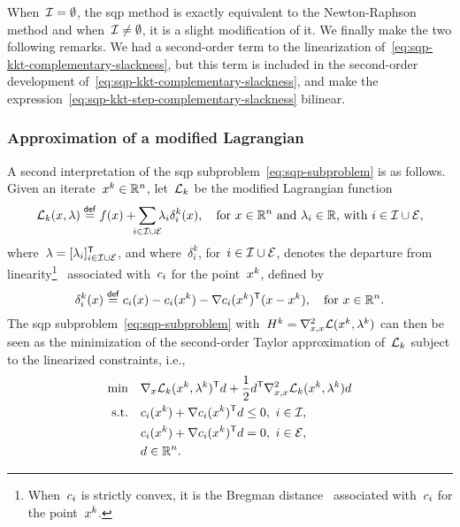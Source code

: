 When~$\mathcal{I} = \emptyset$, the \gls{sqp} method is exactly equivalent to the Newton-Raphson method and when~$\mathcal{I} \neq \emptyset$, it is a slight modification of it.
We finally make the two following remarks.
We had a second-order term to the linearization of~\cref{eq:sqp-kkt-complementary-slackness}, but this term is included in the second-order development of~\cref{eq:sqp-kkt-complementary-slackness}, and make the expression~\cref{eq:sqp-kkt-step-complementary-slackness} bilinear.

\subsubsection{Approximation of a modified Lagrangian}

A second interpretation of the \gls{sqp} subproblem~\cref{eq:sqp-subproblem} is as follows.
Given an iterate~$\iter[k] \in \R^n$, let~$\lag[k]$ be the modified Lagrangian function
\begin{equation*}
    \lag[k](\iter, \lm) \eqdef \obj(\iter) + \sum_{\mathclap{i \in \iub \cup \ieq}} \lm_i \delta_i^k(\iter), \quad \text{for~$\iter \in \R^n$ and~$\lm_i \in \R$, with~$i \in \iub \cup \ieq$},
\end{equation*}
where~$\lm = [\lm_i]_{i \in \iub \cup \ieq}^{\T}$, and where~$\delta_i^k$, for~$i \in \mathcal{I} \cup \mathcal{E}$, denotes the departure from linearity\footnote{When~$c_{i}$ is strictly convex, it is the Bregman distance~\cite{Bregman_1967} associated with~$c_{i}$ for the point~$\iter[k]$.}~\cite{Robinson_1972,Hoek_1982} associated with~$c_{i}$ for the point~$\iter[k]$, defined by
\begin{equation*}
    \delta_i^k(\iter) \eqdef \con{i}(\iter) - \con{i}(\iter[k]) - \nabla \con{i}(\iter[k])^{\T} (\iter - \iter[k]), \quad \text{for~$\iter \in \R^n$.}
\end{equation*}
The \gls{sqp} subproblem~\cref{eq:sqp-subproblem} with~$H^k = \nabla_{x, x}^2 \lag(\iter[k], \lm[k])$ can then be seen as the minimization of the second-order Taylor approximation of~$\lag[k]$ subject to the linearized constraints, i.e.,
\begin{align*}
    \min        & \quad \nabla_x \lag[k](\iter[k], \lm[k])^{\T} \step + \frac{1}{2} \step^{\T} \nabla_{x, x}^2 \lag[k](\iter[k], \lm[k]) \step\\
    \text{s.t.} & \quad \con{i}(\iter[k]) + \nabla \con{i}(\iter[k])^{\T} \step \le 0, ~ i \in \iub,\\
                & \quad \con{i}(\iter[k]) + \nabla \con{i}(\iter[k])^{\T} \step = 0, ~ i \in \ieq,\\
                & \quad \step \in \R^n.
\end{align*}

